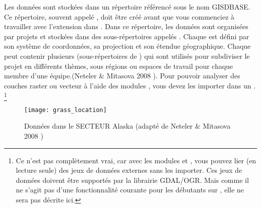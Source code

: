 Les données \grass sont stockées dans un répertoire référencé sous le nom GISDBASE. Ce répertoire, souvent appelé , doit être créé avant que vous commenciez à travailler avec l'extension \grass dans \qg. Dans ce répertoire, les données \grass sont organisées par projets et stockées dans des sous-répertoires appelés . Chaque  est défini par son système de coordonnées, sa projection et son étendue géographique. Chaque  peut contenir plusieurs  (sous-répertoires de ) qui sont utilisés pour subdiviser le projet en différents thèmes, sous régions ou espaces de travail pour chaque membre d'une équipe.(Neteler \& Mitasova 2008 \cite{neteler_mitasova08}). Pour pouvoir analyser des couches raster ou vecteur à l'aide des modules \grass, vous devez les importer dans un . \footnote {Ce n'est pas complètement vrai, car avec les modules \grass {} et , vous pouvez lier (en lecture seule) des jeux de données externes sans les importer. Ces jeux de données doivent être supportés par la librairie GDAL/OGR. Mais comme il ne s'agit pas d'une fonctionnalité courante pour les débutants sur \grass, elle ne sera pas décrite ici.}
\begin{figure}[ht]
\begin{center}
\texttt{[image: grass\_location]}
\caption{Données \grass dans le SECTEUR Alaska (adapté de Neteler \& Mitasova 2008 \cite{neteler_mitasova08})}\label{fig:grass_location}
\end{center}  
\end{figure}

